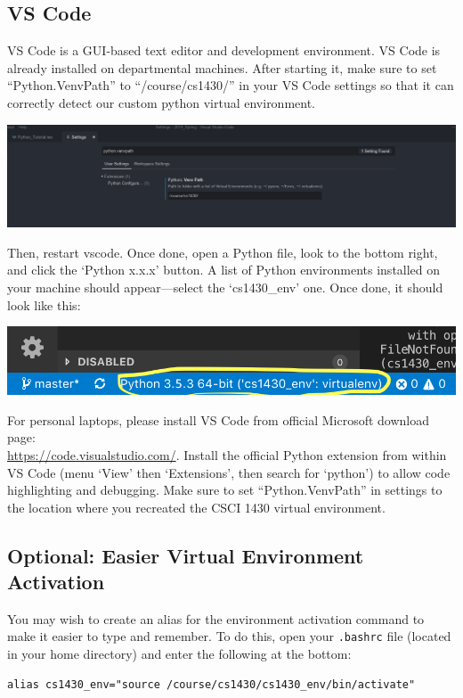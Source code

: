 \documentclass{article}
\begin{document}
\subsection{VS Code}
VS Code is a GUI-based text editor and development environment. VS Code is already installed on departmental machines. After starting it, make sure to set ``Python.VenvPath'' to ``/course/cs1430/'' in your VS Code settings so that it can correctly detect our custom python virtual environment.

\includegraphics[width=\linewidth]{VenvPath.png}

Then, restart vscode. Once done, open a Python file, look to the bottom right, and click the `Python x.x.x' button. A list of Python environments installed on your machine should appear---select the `cs1430\_env' one. Once done, it should look like this:

\includegraphics[width=\linewidth]{VSCode_VenvCorrect.png}

For personal laptops, please install VS Code from official Microsoft download page:\\ \href{https://code.visualstudio.com/}{https://code.visualstudio.com/}. Install the official Python extension from within VS Code (menu `View' then `Extensions', then search for `python') to allow code highlighting and debugging. Make sure to set ``Python.VenvPath'' in settings to the location where you recreated the CSCI 1430 virtual environment.


\subsection{Optional: Easier Virtual Environment Activation}
\label{sec:venvactivation}

You may wish to create an alias for the environment activation command to make it easier to type and remember. To do this, open your \texttt{.bashrc} file (located in your home directory) and enter the following at the bottom:
\begin{verbatim}
alias cs1430_env="source /course/cs1430/cs1430_env/bin/activate"
\end{verbatim}
\end{document}
